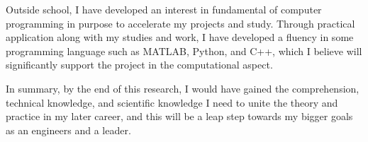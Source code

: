 Outside school, I have developed an interest in fundamental of computer programming in purpose to accelerate my projects and study. Through practical application along with my studies and work, I have developed a fluency in some programming language such as MATLAB, Python, and C++, which I believe will significantly support the project in the computational aspect.

In summary, by the end of this research, I would have gained the comprehension, technical knowledge, and scientific knowledge I need to unite the theory and practice in my later career, and this will be a leap step towards my bigger goals as an engineers and a leader.



